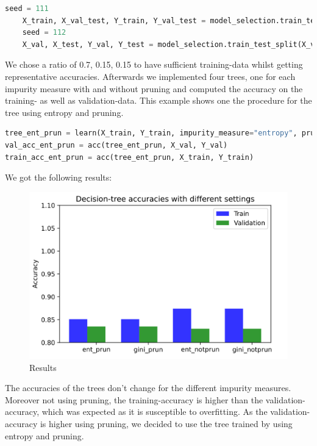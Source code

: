 \documentclass[12pt,a4paper]{scrartcl}		%
\begin{document}
\begin{lstlisting}[language=Python]
    seed = 111
    X_train, X_val_test, Y_train, Y_val_test = model_selection.train_test_split(X, y, test_size= 0.3, shuffle=True, random_state = seed)
    seed = 112
    X_val, X_test, Y_val, Y_test = model_selection.train_test_split(X_val_test, Y_val_test, test_size= 0.5, shuffle=True, random_state = seed)
\end{lstlisting}

We chose a ratio of 0.7, 0.15, 0.15 to have sufficient training-data whilst getting representative accuracies. 
Afterwards we implemented four trees, one for each impurity measure with and without pruning and computed the 
accuracy on the training- as well as validation-data. This example shows one the procedure for the tree using 
entropy and pruning. 

\begin{lstlisting}[language=Python]
    tree_ent_prun = learn(X_train, Y_train, impurity_measure="entropy", pruning=True)
val_acc_ent_prun = acc(tree_ent_prun, X_val, Y_val)
train_acc_ent_prun = acc(tree_ent_prun, X_train, Y_train)
\end{lstlisting}

We got the following results: 

\begin{figure}[h]
    \centering
    \includegraphics[scale = 0.8]{results.png}
    \caption{Results}
\end{figure}

The accuracies of the trees don’t change for the different impurity measures. Moreover not using pruning, 
the training-accuracy is higher than the validation-accuracy, which was expected as it is susceptible to 
overfitting. As the validation-accuracy is higher using pruning, we decided to use the tree trained by using 
entropy and pruning.
\end{document}
